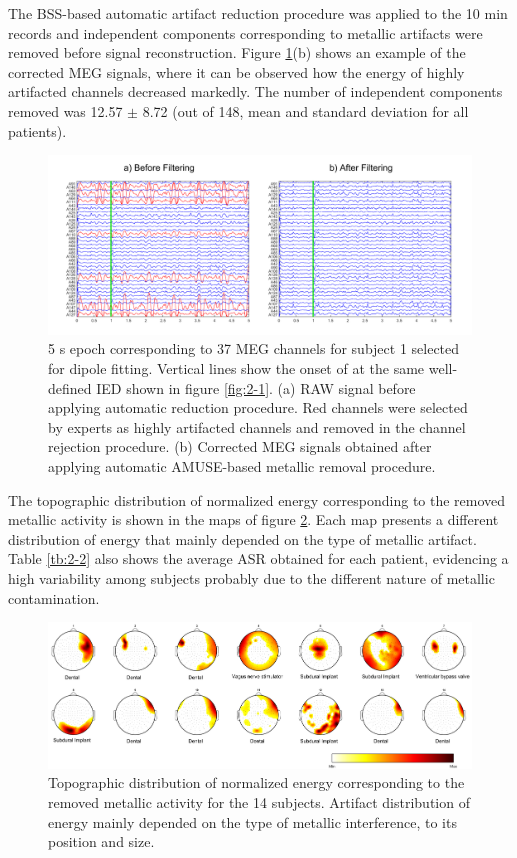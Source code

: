 The BSS-based automatic artifact reduction procedure was applied to the 10 min records and independent components corresponding to metallic artifacts were removed before signal reconstruction. Figure \ref{fig:2-2}(b) shows an example of the corrected MEG signals, where it can be observed how the energy of highly artifacted channels decreased markedly. The number of independent components removed was 12.57 $\pm$ 8.72 (out of 148, mean and standard deviation for all patients).

\begin{figure}[h]
\centering
\includegraphics[width=1\textwidth]{Images/fig2-2.png}
\caption{5 s epoch corresponding to 37 MEG channels for subject 1 selected for dipole fitting. Vertical lines show the onset of at the same well-defined IED shown in figure \ref{fig:2-1}. (a) RAW signal before applying automatic reduction procedure. Red channels were selected by experts as highly artifacted channels and removed in the channel rejection procedure. (b) Corrected MEG signals obtained after applying automatic AMUSE-based metallic removal procedure.}
\label{fig:2-2}
\end{figure} 

The topographic distribution of normalized energy corresponding to the removed metallic activity is shown in the maps of figure \ref{fig:2-3}. Each map presents a different distribution of energy that mainly depended on the type of metallic artifact. Table \ref{tb:2-2} also shows the average ASR obtained for each patient, evidencing a high variability among subjects probably due to the different nature of metallic contamination.

\begin{figure}[h]
\centering
\hspace*{-0.75cm}
\includegraphics[width=1.1\textwidth]{Images/fig2-3.png}
\caption{Topographic distribution of normalized energy corresponding to the removed metallic activity for the 14 subjects. Artifact distribution of energy mainly depended on the type of metallic interference, to its position and size.}
\label{fig:2-3}
\end{figure} 


